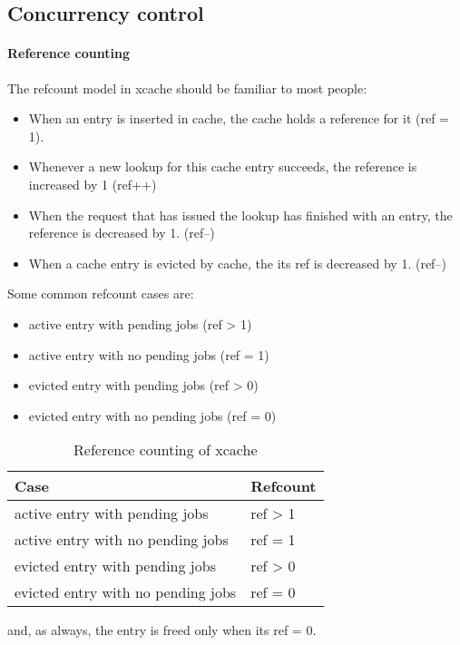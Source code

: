 \subsection{Concurrency control}

\paragraph{Reference counting}

The refcount model in xcache should be familiar to most people:

\begin{itemize}
	\item When an entry is inserted in cache, the cache holds a reference 
		for it (ref = 1).
	\item Whenever a new lookup for this cache entry succeeds, the reference 
		is increased by 1 (ref++)
	\item When the request that has issued the lookup has finished with an 
		entry, the reference is decreased by 1. (ref--)
	\item When a cache entry is evicted by cache, the its ref is decreased 
		by 1. (ref--)
\end{itemize}

Some common refcount cases are:

\begin{itemize}
	\item active entry with pending jobs (ref > 1)
	\item active entry with no pending jobs (ref = 1)
	\item evicted entry with pending jobs (ref > 0)
	\item evicted entry with no pending jobs (ref = 0)
\end{itemize}

\begin{table}[tbp]
	\centering
	\begin{tabular}{ | l | l | }
		\hline
		Case & Refcount \\ \hline \hline
		active entry with pending jobs & ref > 1 \\ \hline
		active entry with no pending jobs & ref = 1 \\ \hline
		evicted entry with pending jobs & ref > 0 \\ \hline
		evicted entry with no pending jobs & ref = 0 \\ \hline
	\end{tabular}
	\caption{Reference counting of xcache}
	\label{tab:refcount}
\end{table}

and, as always, the entry is freed only when its ref = 0.

